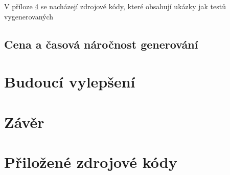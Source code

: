\documentclass[czech, ma, kiv, he, iso690alph, pdf, viewonly]{fasthesis}
\begin{document}
        V příloze \ref{sec:appendix:src} se nacházejí zdrojové kódy, které obsahují ukázky jak testů vygenerovaných 


    \section{Cena a časová náročnost generování}

\chapter{Budoucí vylepšení}

\chapter{Závěr}

\appendix

    \chapter{Přiložené zdrojové kódy} \label{sec:appendix:src}
\end{document}
